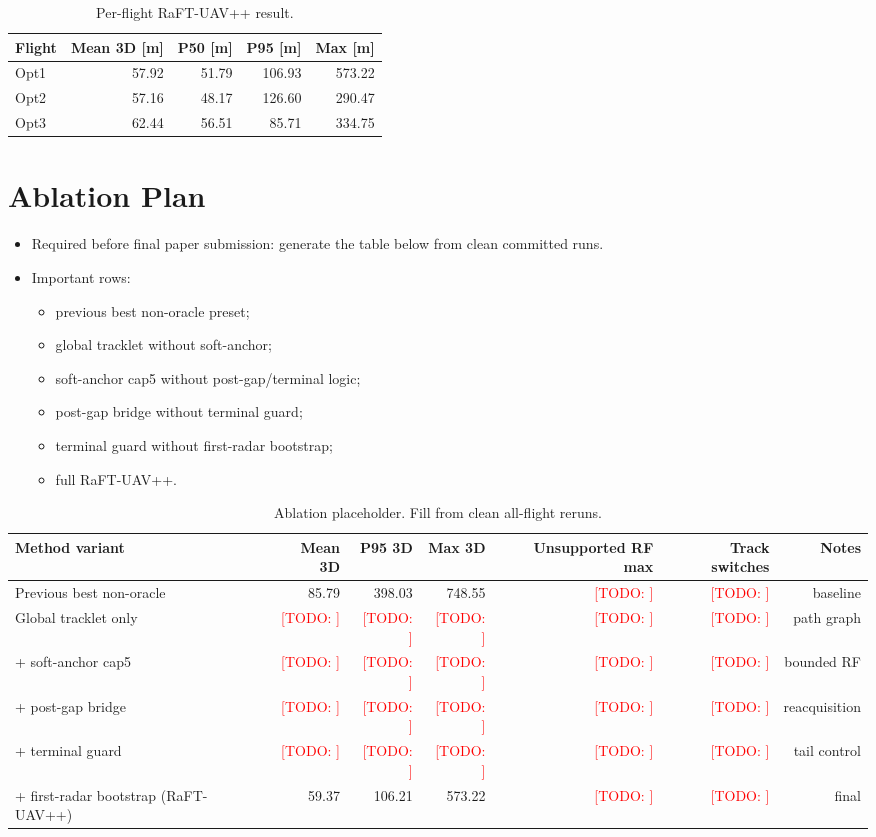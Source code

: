 \documentclass[10pt,conference]{IEEEtran}
\newcommand{\raftpp}{RaFT-UAV++\xspace}
\newcommand{\todo}[1]{\textcolor{red}{[TODO: #1]}}
\begin{document}
\begin{table}[t]
\centering
\caption{Per-flight \raftpp result.}
\label{tab:raftpp_by_flight}
\begin{tabular}{lrrrr}
\toprule
Flight & Mean 3D [m] & P50 [m] & P95 [m] & Max [m] \\
\midrule
Opt1 & 57.92 & 51.79 & 106.93 & 573.22 \\
Opt2 & 57.16 & 48.17 & 126.60 & 290.47 \\
Opt3 & 62.44 & 56.51 & 85.71 & 334.75 \\
\bottomrule
\end{tabular}
\end{table}

\section{Ablation Plan}
\label{sec:ablation}

\begin{itemize}[leftmargin=*]
  \item Required before final paper submission: generate the table below from clean committed runs.
  \item Important rows:\vspace{-0.25em}
  \begin{itemize}[leftmargin=*]
    \item previous best non-oracle preset;
    \item global tracklet without soft-anchor;
    \item soft-anchor cap5 without post-gap/terminal logic;
    \item post-gap bridge without terminal guard;
    \item terminal guard without first-radar bootstrap;
    \item full \raftpp.
  \end{itemize}
\end{itemize}

\begin{table}[t]
\centering
\caption{Ablation placeholder. Fill from clean all-flight reruns.}
\label{tab:ablation}
\begin{tabular}{lrrrrrr}
\toprule
Method variant & Mean 3D & P95 3D & Max 3D & Unsupported RF max & Track switches & Notes \\
\midrule
Previous best non-oracle & 85.79 & 398.03 & 748.55 & \todo{} & \todo{} & baseline \\
Global tracklet only & \todo{} & \todo{} & \todo{} & \todo{} & \todo{} & path graph \\
+ soft-anchor cap5 & \todo{} & \todo{} & \todo{} & \todo{} & \todo{} & bounded RF \\
+ post-gap bridge & \todo{} & \todo{} & \todo{} & \todo{} & \todo{} & reacquisition \\
+ terminal guard & \todo{} & \todo{} & \todo{} & \todo{} & \todo{} & tail control \\
+ first-radar bootstrap (\raftpp) & 59.37 & 106.21 & 573.22 & \todo{} & \todo{} & final \\
\bottomrule
\end{tabular}
\end{table}
\end{document}
